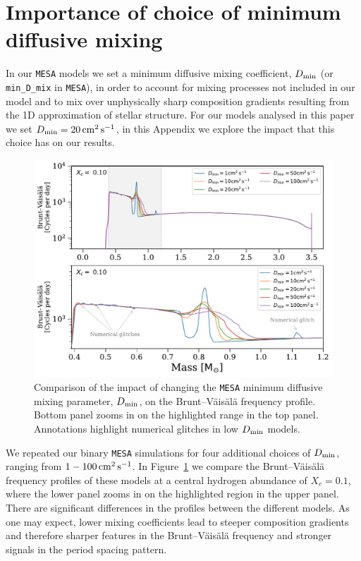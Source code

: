 \documentclass[desactivate]{aa}
\begin{document}



\restartappendixnumbering

\allowdisplaybreaks
\appendix

\section{Importance of choice of minimum diffusive mixing}\label{app:min_D_mix}

In our \texttt{MESA} models we set a minimum diffusive mixing coefficient, $D_{\rm min}$ (or \texttt{min\_D\_mix} in \texttt{MESA}), in order to account for mixing processes not included in our model and to mix over unphysically sharp composition gradients resulting from the 1D approximation of stellar structure. For our models analysed in this paper we set $D_{\rm min} = 20 \,{\rm cm^2 \, s^{-1}}$, in this Appendix we explore the impact that this choice has on our results.

\begin{figure}[b]
    \centering
    \includegraphics[width=\columnwidth]{figures/min_D_mix_comparison.pdf}
    \caption{Comparison of the impact of changing the \texttt{MESA} minimum diffusive mixing parameter, $D_{\rm min}$, on the Brunt–Väisälä frequency profile. Bottom panel zooms in on the highlighted range in the top panel. Annotations highlight numerical glitches in low $D_{\rm min}$ models.}
    \label{fig:min_D_mix}
\end{figure}

We repeated our binary \texttt{MESA} simulations for four additional choices of $D_{\rm min}$, ranging from $1 - 100 \,{\rm cm^2 \, s^{-1}}$. In Figure~\ref{fig:min_D_mix} we compare the Brunt–Väisälä frequency profiles of these models at a central hydrogen abundance of $X_c = 0.1$, where the lower panel zooms in on the highlighted region in the upper panel. There are significant differences in the profiles between the different models. As one may expect, lower mixing coefficients lead to steeper composition gradients and therefore sharper features in the Brunt–Väisälä frequency and stronger signals in the period spacing pattern.
\end{document}

